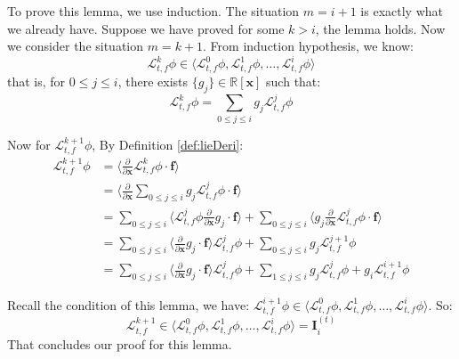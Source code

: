 \documentclass{article}
\begin{document}
\begin{Proof}
To prove this lemma, we use induction. The situation $m = i+1$ is exactly what we already have. Suppose we have proved for some $k > i$, the lemma holds. Now we consider the situation $m = k+1$. From induction hypothesis, we know: 
		\begin{equation*}
			\mathcal{L}_{t, f}^k \phi \in \langle \mathcal{L}_{t, f}^0 \phi, \mathcal{L}_{t, f}^1 \phi, \dots, \mathcal{L}_{t, f}^i \phi \rangle
		\end{equation*}
that is, for $0 \leq j \leq i$, there exists $\{ g_j \} \in \mathbb{R} [\boldsymbol{x}]$ such that: 
		\begin{equation*}
			\mathcal{L}_{t, f}^k \phi = \sum_{0 \leq j \leq i} g_j \mathcal{L}_{t, f}^j \phi
		\end{equation*}

Now for $\mathcal{L}_{t, f}^{k+1} \phi$,  By Definition \ref{def:lieDeri}:
		\begin{equation*}
		\begin{split}
			\mathcal{L}_{t, f}^{k+1} \phi &= \langle \frac{\partial}{\partial \boldsymbol{x}} \mathcal{L}_{t, f}^{k} \phi \cdot  \boldsymbol{f} \rangle \\
								&= \langle \frac{\partial}{\partial \boldsymbol{x}} \sum_{0 \leq j \leq i} g_j \mathcal{L}_{t, f}^j \phi \cdot \boldsymbol{f} \rangle \\
								&= \sum_{0 \leq j \leq i} \langle \mathcal{L}_{t, f}^j \phi \frac{\partial}{\partial \boldsymbol{x}} g_j \cdot \boldsymbol{f} \rangle + \sum_{0 \leq j \leq i} \langle g_j \frac{\partial}{\partial \boldsymbol{x}} \mathcal{L}_{t, f}^j \phi \cdot \boldsymbol{f} \rangle \\
								&= \sum_{0 \leq j \leq i} \langle \frac{\partial}{\partial \boldsymbol{x}} g_j \cdot \boldsymbol{f} \rangle \mathcal{L}_{t, f}^j \phi + \sum_{0 \leq j \leq i} g_j \mathcal{L}_{t, f}^{j+1} \phi  \\
								&= \sum_{0 \leq j \leq i} \langle \frac{\partial}{\partial \boldsymbol{x}} g_j \cdot \boldsymbol{f} \rangle \mathcal{L}_{t, f}^j \phi + \sum_{1 \leq j \leq i} g_j \mathcal{L}_{t, f}^{j} \phi + g_i \mathcal{L}_{t, f}^{i+1} \phi
		\end{split}
		\end{equation*}
		
Recall the condition of this lemma, we have: $\mathcal{L}_{t, f}^{i+1} \phi \in \langle \mathcal{L}_{t, f}^0 \phi, \mathcal{L}_{t, f}^1 \phi, \dots, \mathcal{L}_{t, f}^i \phi \rangle$. So: 
		\begin{equation*}
			\mathcal{L}_{t, f}^{k+1} \in  \langle \mathcal{L}_{t, f}^0 \phi, \mathcal{L}_{t, f}^1 \phi, \dots, \mathcal{L}_{t, f}^i \phi \rangle = \boldsymbol{I}_i^{(t)}
		\end{equation*}
That concludes our proof for this lemma.
\end{Proof}
\end{document}
